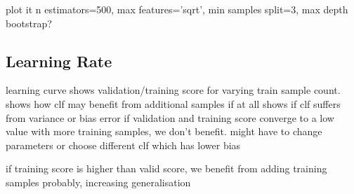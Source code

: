 plot it
            n estimators=500,
            max features='sqrt',
            min samples split=3,
            max depth
            bootstrap?

\subsection{Learning Rate}
learning curve
shows validation/training score for varying train sample count.
shows how clf may benefit from additional samples if at all
shows if clf suffers from variance or bias error
if validation and training score converge to a low value with more training samples,
we don't benefit. might have to change parameters or choose different clf which
has lower bias

if training score is higher than valid score, we benefit from adding training
samples probably, increasing generalisation


